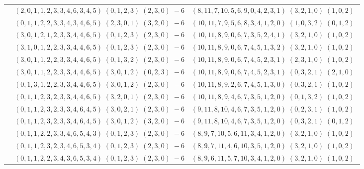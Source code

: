 \documentclass[11pt]{article}
\begin{document}
\begin{longtable}[l]{|c|c|c|}
 \cline{2-3} 
 & $(2 ,0 ,1 ,1 ,2 ,3 ,3 ,4 ,6 ,3 ,4 ,5) \;(0 ,1 ,2 ,3) \;(2 ,3 ,0) \;-6$ & $(8 ,11 ,7 ,10 ,5 ,6 ,9 ,0 ,4 ,2 ,3 ,1) \;(3 ,2 ,1 ,0) \;(1 ,0 ,2) \;$\\ 
 \cline{2-3} 
 & $(0 ,1 ,1 ,2 ,2 ,3 ,3 ,4 ,3 ,4 ,6 ,5) \;(2 ,3 ,0 ,1) \;(3 ,2 ,0) \;-6$ & $(10 ,11 ,7 ,9 ,5 ,6 ,8 ,3 ,4 ,1 ,2 ,0) \;(1 ,0 ,3 ,2) \;(0 ,1 ,2) \;$\\ 
 \cline{2-3} 
 & $(3 ,0 ,1 ,2 ,1 ,2 ,3 ,3 ,4 ,4 ,6 ,5) \;(0 ,1 ,2 ,3) \;(2 ,3 ,0) \;-6$ & $(10 ,11 ,8 ,9 ,0 ,6 ,7 ,3 ,5 ,2 ,4 ,1) \;(3 ,2 ,1 ,0) \;(1 ,0 ,2) \;$\\ 
 \cline{2-3} 
 & $(3 ,1 ,0 ,1 ,2 ,2 ,3 ,3 ,4 ,4 ,6 ,5) \;(0 ,1 ,2 ,3) \;(2 ,3 ,0) \;-6$ & $(10 ,11 ,8 ,9 ,0 ,6 ,7 ,4 ,5 ,1 ,3 ,2) \;(3 ,2 ,1 ,0) \;(1 ,0 ,2) \;$\\ 
 \cline{2-3} 
 & $(3 ,0 ,1 ,1 ,2 ,2 ,3 ,3 ,4 ,4 ,6 ,5) \;(0 ,1 ,3 ,2) \;(2 ,3 ,0) \;-6$ & $(10 ,11 ,8 ,9 ,0 ,6 ,7 ,4 ,5 ,2 ,3 ,1) \;(2 ,3 ,1 ,0) \;(1 ,0 ,2) \;$\\ 
 \cline{2-3} 
 & $(3 ,0 ,1 ,1 ,2 ,2 ,3 ,3 ,4 ,4 ,6 ,5) \;(3 ,0 ,1 ,2) \;(0 ,2 ,3) \;-6$ & $(10 ,11 ,8 ,9 ,0 ,6 ,7 ,4 ,5 ,2 ,3 ,1) \;(0 ,3 ,2 ,1) \;(2 ,1 ,0) \;$\\ 
 \cline{2-3} 
 & $(0 ,1 ,3 ,1 ,2 ,2 ,3 ,3 ,4 ,4 ,6 ,5) \;(3 ,0 ,1 ,2) \;(2 ,3 ,0) \;-6$ & $(10 ,11 ,8 ,9 ,2 ,6 ,7 ,4 ,5 ,1 ,3 ,0) \;(0 ,3 ,2 ,1) \;(1 ,0 ,2) \;$\\ 
 \cline{2-3} 
 & $(0 ,1 ,1 ,2 ,3 ,2 ,3 ,3 ,4 ,4 ,6 ,5) \;(3 ,2 ,0 ,1) \;(2 ,3 ,0) \;-6$ & $(10 ,11 ,8 ,9 ,4 ,6 ,7 ,3 ,5 ,1 ,2 ,0) \;(0 ,1 ,3 ,2) \;(1 ,0 ,2) \;$\\ 
 \cline{2-3} 
 & $(0 ,1 ,1 ,2 ,3 ,2 ,3 ,3 ,4 ,6 ,4 ,5) \;(3 ,0 ,2 ,1) \;(2 ,3 ,0) \;-6$ & $(9 ,11 ,8 ,10 ,4 ,6 ,7 ,3 ,5 ,1 ,2 ,0) \;(0 ,2 ,3 ,1) \;(1 ,0 ,2) \;$\\ 
 \cline{2-3} 
 & $(0 ,1 ,1 ,2 ,3 ,2 ,3 ,3 ,4 ,6 ,4 ,5) \;(3 ,0 ,1 ,2) \;(3 ,2 ,0) \;-6$ & $(9 ,11 ,8 ,10 ,4 ,6 ,7 ,3 ,5 ,1 ,2 ,0) \;(0 ,3 ,2 ,1) \;(0 ,1 ,2) \;$\\ 
 \cline{2-3} 
 & $(0 ,1 ,1 ,2 ,2 ,3 ,3 ,4 ,6 ,5 ,4 ,3) \;(0 ,1 ,2 ,3) \;(2 ,3 ,0) \;-6$ & $(8 ,9 ,7 ,10 ,5 ,6 ,11 ,3 ,4 ,1 ,2 ,0) \;(3 ,2 ,1 ,0) \;(1 ,0 ,2) \;$\\ 
 \cline{2-3} 
 & $(0 ,1 ,1 ,2 ,3 ,2 ,3 ,4 ,6 ,5 ,3 ,4) \;(0 ,1 ,2 ,3) \;(2 ,3 ,0) \;-6$ & $(8 ,9 ,7 ,11 ,4 ,6 ,10 ,3 ,5 ,1 ,2 ,0) \;(3 ,2 ,1 ,0) \;(1 ,0 ,2) \;$\\ 
 \cline{2-3} 
 & $(0 ,1 ,1 ,2 ,2 ,3 ,4 ,3 ,6 ,5 ,3 ,4) \;(0 ,1 ,2 ,3) \;(2 ,3 ,0) \;-6$ & $(8 ,9 ,6 ,11 ,5 ,7 ,10 ,3 ,4 ,1 ,2 ,0) \;(3 ,2 ,1 ,0) \;(1 ,0 ,2) \;$\\ 

\end{longtable}
\end{document}
